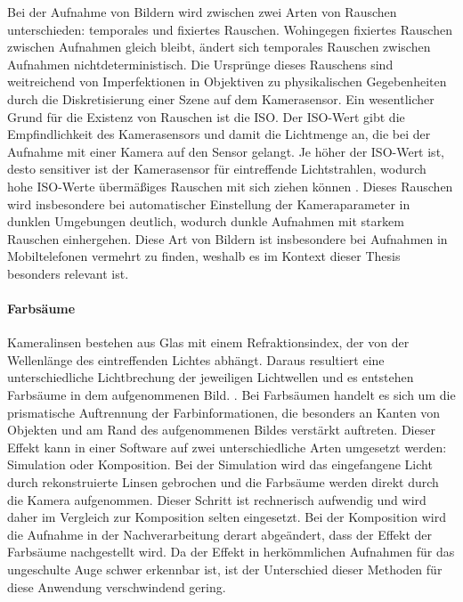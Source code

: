 Bei der Aufnahme von Bildern wird zwischen zwei Arten von Rauschen unterschieden: temporales und fixiertes Rauschen. Wohingegen fixiertes Rauschen zwischen Aufnahmen gleich bleibt, ändert sich temporales Rauschen zwischen Aufnahmen nichtdeterministisch. Die Ursprünge dieses Rauschens sind weitreichend von Imperfektionen in Objektiven zu physikalischen Gegebenheiten durch die Diskretisierung einer Szene auf dem Kamerasensor. Ein wesentlicher Grund für die Existenz von Rauschen ist die ISO. Der ISO-Wert gibt die Empfindlichkeit des Kamerasensors und damit die Lichtmenge an, die bei der Aufnahme mit einer Kamera auf den Sensor gelangt. Je höher der ISO-Wert ist, desto sensitiver ist der Kamerasensor für eintreffende Lichtstrahlen, wodurch hohe ISO-Werte übermäßiges Rauschen mit sich ziehen können \cite{camera_everything}. Dieses Rauschen wird insbesondere bei automatischer Einstellung der Kameraparameter in dunklen Umgebungen deutlich, wodurch dunkle Aufnahmen mit starkem Rauschen einhergehen. Diese Art von Bildern ist insbesondere bei Aufnahmen in Mobiltelefonen vermehrt zu finden, weshalb es im Kontext dieser Thesis besonders relevant ist.

\paragraph{Farbsäume}

Kameralinsen bestehen aus Glas mit einem Refraktionsindex, der von der Wellenlänge des eintreffenden Lichtes abhängt. Daraus resultiert eine unterschiedliche Lichtbrechung der jeweiligen Lichtwellen und es entstehen Farbsäume in dem aufgenommenen Bild. \cite{lens_distortion, camera_everything}. Bei Farbsäumen handelt es sich um die prismatische Auftrennung der Farbinformationen, die besonders an Kanten von Objekten und am Rand des aufgenommenen Bildes verstärkt auftreten. Dieser Effekt kann in einer Software auf zwei unterschiedliche Arten umgesetzt werden: Simulation oder Komposition. Bei der Simulation wird das eingefangene Licht durch rekonstruierte Linsen gebrochen und die Farbsäume werden direkt durch die Kamera aufgenommen. Dieser Schritt ist rechnerisch aufwendig und wird daher im Vergleich zur Komposition selten eingesetzt. Bei der Komposition wird die Aufnahme in der Nachverarbeitung derart abgeändert, dass der Effekt der Farbsäume nachgestellt wird. Da der Effekt in herkömmlichen Aufnahmen für das ungeschulte Auge schwer erkennbar ist, ist der Unterschied dieser Methoden für diese Anwendung verschwindend gering.

